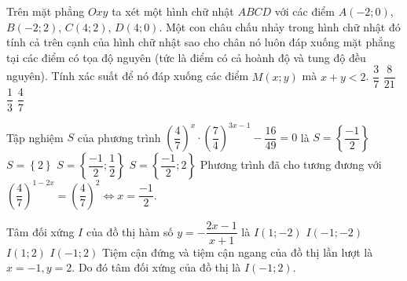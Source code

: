 \begin{ex}%
Trên mặt phẳng $Oxy$ ta xét một hình chữ nhật $ABCD$ với các điểm $A(-2;0)$, $B(-2;2)$, $C(4;2)$, $D(4;0)$. Một con châu chấu nhảy trong hình chữ nhật đó tính cả trên cạnh của hình chữ nhật sao cho chân nó luôn đáp xuống mặt phẳng tại các điểm có tọa độ nguyên (tức là điểm có  cả hoành độ và tung độ đều nguyên). Tính xác suất để nó đáp xuống các điểm $M(x;y)$ mà $x+y <2$.
 \choice 
{\True $\dfrac{3}{7}$}
{$\dfrac{8}{21}$}
{$\dfrac{1}{3}$}
{$\dfrac{4}{7}$}
\loigiai
{
{
}
}
\end{ex}


\begin{ex}%
Tập nghiệm $S$ của phương trình $\left (\dfrac{4}{7}\right )^x \cdot \left (\dfrac{7}{4}\right )^{3x-1} -\dfrac{16}{49} =0$ là
 \choice 
{\True $S=\left \{ \dfrac{-1}{2}\right \}$}
{$S=\left \{ 2\right \}$}
{$S=\left \{ \dfrac{-1}{2};\dfrac{1}{2}\right \}$}
{$S=\left \{ \dfrac{-1}{2}; 2\right \}$}
\loigiai
{
Phương trình đã cho tương đương với $\left (\dfrac{4}{7}\right )^{1-2x} =\left (\dfrac{4}{7}\right )^2 \Leftrightarrow x=\dfrac{-1}{2}$.
}
\end{ex}


\begin{ex}%
Tâm đối xứng $I$ của đồ thị hàm số $y=-\dfrac{2x-1}{x+1}$ là
 \choice 
{$I(1;-2)$}
{\True $I(-1;-2)$}
{$I(1;2)$}
{$I(-1;2)$}
\loigiai
{
Tiệm cận đứng và tiệm cận ngang của đồ thị lần lượt là $x=-1, y=2$. Do đó tâm đối xứng của đồ thị là $I(-1;2)$.
}
\end{ex}


